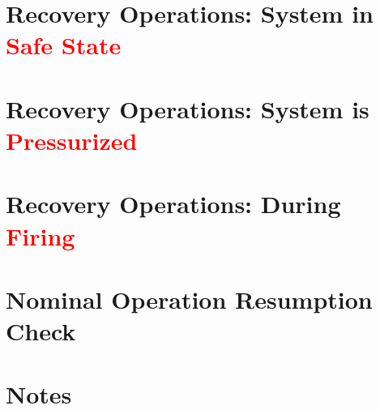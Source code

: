 \documentclass{article}
\begin{document}
\setcounter{section}{0}

\section{Recovery Operations: System in \textcolor{red}{Safe State}}


\section{Recovery Operations: System is \textcolor{red}{Pressurized}}


\section{Recovery Operations: During \textcolor{red}{Firing}}


\section{Nominal Operation Resumption Check}


\newpage

\setcounter{section}{0}
\section*{Notes}

\end{document}
